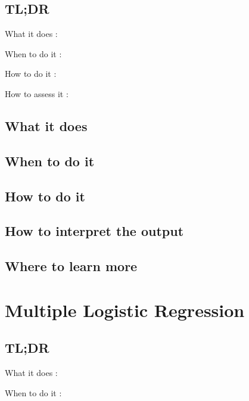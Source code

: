 \documentclass[
]{book}
\begin{document}
\hypertarget{tldr-2}{%
\section{TL;DR}\label{tldr-2}}

What it does
:

When to do it
:

How to do it
:

How to assess it
:

\hypertarget{what-it-does-2}{%
\section{What it does}\label{what-it-does-2}}

\hypertarget{when-to-do-it-2}{%
\section{When to do it}\label{when-to-do-it-2}}

\hypertarget{how-to-do-it-2}{%
\section{How to do it}\label{how-to-do-it-2}}

\hypertarget{how-to-interpret-the-output-2}{%
\section{How to interpret the output}\label{how-to-interpret-the-output-2}}

\hypertarget{where-to-learn-more-2}{%
\section{Where to learn more}\label{where-to-learn-more-2}}

\hypertarget{multiple-logistic-regression}{%
\chapter{Multiple Logistic Regression}\label{multiple-logistic-regression}}

\hypertarget{tldr-3}{%
\section{TL;DR}\label{tldr-3}}

What it does
:

When to do it
:
\end{document}

